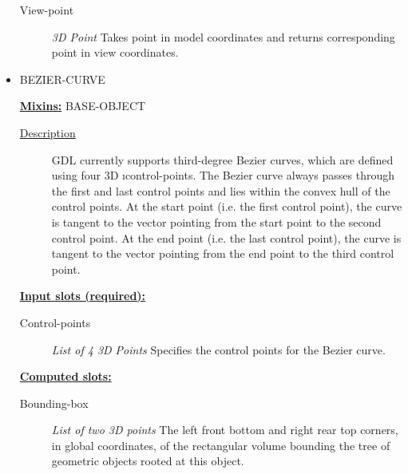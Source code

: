 \documentclass [11pt]{book}
\begin{document}
\begin{itemize}
\begin{description}
\item [View-point]
\emph{3D Point} Takes point in model coordinates and returns corresponding point in view coordinates.


\end{description}







\item {}BEZIER-CURVE


\textbf{
\underline{Mixins:}} BASE-OBJECT





\begin{description}

\item [
\underline{Description}]


GDL currently supports third-degree Bezier curves, which are 
defined using four 3D 
\i{control-points}. The Bezier curve always passes 
through the first and last control points and lies within the convex hull of the control 
points. At the start point (i.e. the first control point), the curve is tangent 
to the vector pointing from the start point to the second control point. 
At the end point (i.e. the last control point), the curve is tangent to the 
vector pointing from the end point to the third control point.



\end{description}








\textbf{
\underline{Input slots (required):}}

\begin{description}

\item [Control-points]
\emph{List of 4 3D Points} Specifies the control points for the Bezier curve.


\end{description}






\textbf{
\underline{Computed slots:}}

\begin{description}

\item [Bounding-box]
\emph{List of two 3D points} The left front bottom and right rear top corners, in global coordinates,
of the rectangular volume bounding the tree of geometric objects rooted at this object.



\end{description}
\end{itemize}
\end{document}
